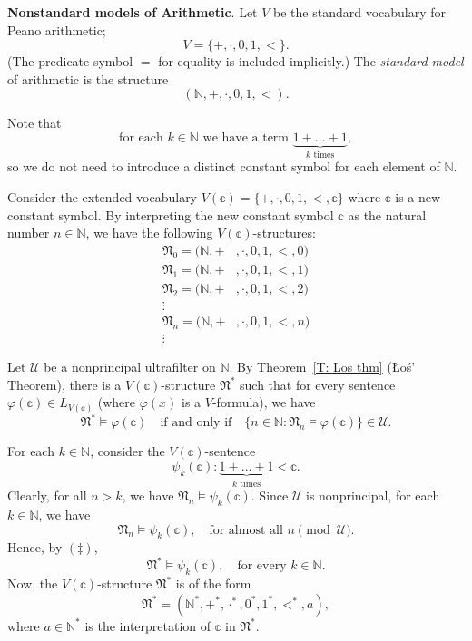 \documentclass{scrartcl}
\begin{document}
\begin{example}
\textbf{Nonstandard models of Arithmetic}.
\label{E:nonstandard arithmetic}
Let $V$ be the standard vocabulary for Peano arithmetic;
\[
V= \{ +,\cdot, 0,1,< \}.
\] 
(The predicate symbol $=$ for equality is included implicitly.) The \emph{standard model} of arithmetic is the structure
\[
(\mathbb{N}, +,\cdot, 0,1,< )\text{.}
\]


Note that 
\[
\tag{$\dagger$}
\text{for each $k\in \mathbb N$ we have a term  $\underbrace{1+\dots+1}_{k\text{ times}}$},
\]
so we do not need to introduce a distinct constant symbol for each element of $\mathbb{N}$.

Consider the extended vocabulary $V(\mathbb{c}) = \{ +,\cdot, 0,1,<, \mathbb{c} \}$ where $\mathbb{c}$ is a new constant symbol. By interpreting the new constant symbol $\mathbb{c}$ as the natural number $n\in\mathbb{N}$, we have the following $V(\mathbb{c})$-structures:
\begin{align*}
\mathfrak{N}_0 = (\mathbb{N},+&,\cdot,0,1,<,0)\\
\mathfrak{N}_1 = (\mathbb{N},+&,\cdot,0,1,<,1)\\
\mathfrak{N}_2 = (\mathbb{N},+&,\cdot,0,1,<,2)\\
\vdots\\
\mathfrak{N}_n = (\mathbb{N},+&,\cdot,0,1,<,n)\\
\vdots
\end{align*}

Let $\mathscr{U}$ be a nonprincipal ultrafilter on $\mathbb{N}$. By Theorem~\ref{T: Los thm} (\L o\'s' Theorem), there is a $V(\mathbb{c})$-structure $\mathfrak{N}^*$ such that for every sentence $\varphi(\mathbb{c})\in L_{V(\mathbb{c})}$ (where $\varphi(x)$ is a $V$-formula), we have 
\[
\tag{$\ddagger$}
\mathfrak{N}^*\models \varphi(\mathbb{c}) 
\quad
\text{if and only if} 
\quad
\{n\in \mathbb{N}\colon \mathfrak{N}_n\models\varphi(\mathbb{c})\}\in\mathscr{U} \text{.}
\]

For each $k\in\mathbb{N}$, consider the $V(\mathbb{c})$-sentence
\[
\psi_k(\mathbb{c}) : \underbrace{1+\dots+1}_{k\text{ times}} < \mathbb{c}.
\]
Clearly, for all $n>k$, we have $\mathfrak{N}_n\models\psi_k(\mathbb{c})$. Since $\mathscr{U}$ is nonprincipal, for each $k\in\mathbb{N}$, we have
\[
\mathfrak{N}_n\models\psi_k(\mathbb{c}),
\quad
\text{for almost all $n\pmod{\mathscr{U}}$}. 
\]
Hence, by $(\ddagger)$,
\[
\tag{$\dagger\ddagger$}
\mathfrak{N}^* 
\models \psi_k(\mathbb{c}),
\quad
\text{for every $k\in\mathbb{N}$}.
\]
Now, the $V(\mathbb{c})$-structure $\mathfrak{N}^*$ is of the form
\[
\mathfrak{N}^*=(\mathbb{N}^*,+^*,\cdot ^*,0^*,1^*,<^*,a),
\]
where $a\in\mathbb{N}^*$ is the interpretation of $\mathbb{c}$ in  $\mathfrak{N}^*$.


\end{example}
\end{document}
